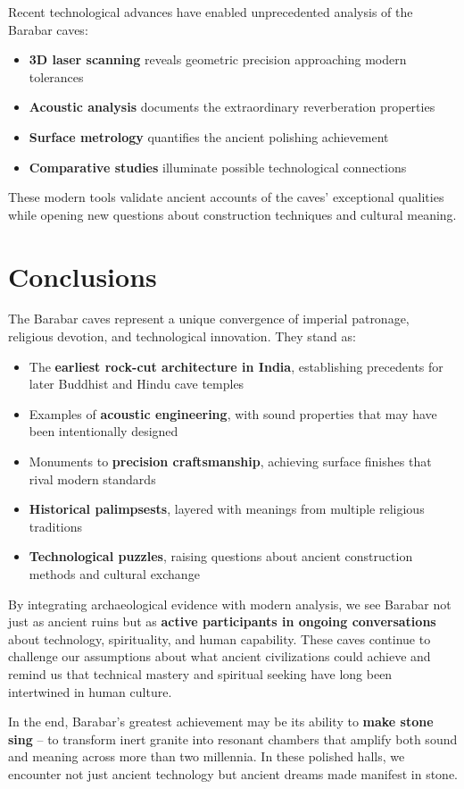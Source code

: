 \documentclass[11pt]{article}
\begin{document}
Recent technological advances have enabled unprecedented analysis of the Barabar caves:

\begin{itemize}
\item \textbf{3D laser scanning} reveals geometric precision approaching modern tolerances
\item \textbf{Acoustic analysis} documents the extraordinary reverberation properties
\item \textbf{Surface metrology} quantifies the ancient polishing achievement
\item \textbf{Comparative studies} illuminate possible technological connections
\end{itemize}

These modern tools validate ancient accounts of the caves' exceptional qualities while opening new questions about construction techniques and cultural meaning.

\section{Conclusions}

The Barabar caves represent a unique convergence of imperial patronage, religious devotion, and technological innovation. They stand as:

\begin{itemize}
\item The \textbf{earliest rock-cut architecture in India}, establishing precedents for later Buddhist and Hindu cave temples
\item Examples of \textbf{acoustic engineering}, with sound properties that may have been intentionally designed
\item Monuments to \textbf{precision craftsmanship}, achieving surface finishes that rival modern standards
\item \textbf{Historical palimpsests}, layered with meanings from multiple religious traditions
\item \textbf{Technological puzzles}, raising questions about ancient construction methods and cultural exchange
\end{itemize}

By integrating archaeological evidence with modern analysis, we see Barabar not just as ancient ruins but as \textbf{active participants in ongoing conversations} about technology, spirituality, and human capability. These caves continue to challenge our assumptions about what ancient civilizations could achieve and remind us that technical mastery and spiritual seeking have long been intertwined in human culture.

In the end, Barabar's greatest achievement may be its ability to \textbf{make stone sing} -- to transform inert granite into resonant chambers that amplify both sound and meaning across more than two millennia. In these polished halls, we encounter not just ancient technology but ancient dreams made manifest in stone.
\end{document}
